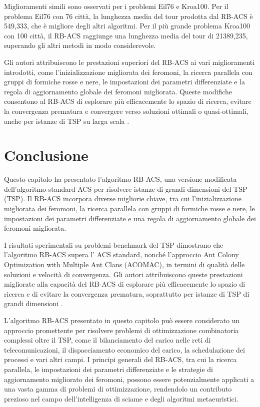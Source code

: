 Miglioramenti simili sono osservati per i problemi Eil76 e Kroa100. Per il problema Eil76 con 76 città, la lunghezza media del tour prodotta dal \gls{RB-ACS} è 549,333, che è migliore degli altri algoritmi. Per il più grande problema Kroa100 con 100 città, il \gls{RB-ACS} raggiunge una lunghezza media del tour di 21389,235, superando gli altri metodi in modo considerevole.

Gli autori attribuiscono le prestazioni superiori del \gls{RB-ACS} ai vari miglioramenti introdotti, come l'inizializzazione migliorata dei feromoni, la ricerca parallela con gruppi di formiche rosse e nere, le impostazioni dei parametri differenziate e la regola di aggiornamento globale dei feromoni migliorata. Queste modifiche consentono al \gls{RB-ACS} di esplorare più efficacemente lo spazio di ricerca, evitare la convergenza prematura e convergere verso soluzioni ottimali o quasi-ottimali, anche per istanze di \gls{TSP} su larga scala \cite{Hassan2013}.

\section{Conclusione}
Questo capitolo ha presentato l'algoritmo \gls{RB-ACS}, una versione modificata dell'algoritmo standard \gls{ACS} per risolvere istanze di grandi dimensioni del  \gls{TSP} (TSP). Il \gls{RB-ACS} incorpora diverse migliorie chiave, tra cui l'inizializzazione migliorata dei feromoni, la ricerca parallela con gruppi di formiche rosse e nere, le impostazioni dei parametri differenziate e una regola di aggiornamento globale dei feromoni migliorata.

I risultati sperimentali su problemi benchmark del \gls{TSP} dimostrano che l'algoritmo \gls{RB-ACS} supera l' \gls{ACS} standard, nonché l'approccio Ant Colony Optimization with Multiple Ant Clans (\gls{ACOMAC}), in termini di qualità delle soluzioni e velocità di convergenza. Gli autori attribuiscono queste prestazioni migliorate alla capacità del \gls{RB-ACS} di esplorare più efficacemente lo spazio di ricerca e di evitare la convergenza prematura, soprattutto per istanze di \gls{TSP} di grandi dimensioni \cite{Hassan2013}.

L'algoritmo \gls{RB-ACS} presentato in questo capitolo può essere considerato un approccio promettente per risolvere problemi di ottimizzazione combinatoria complessi oltre il  \gls{TSP}, come il bilanciamento del carico nelle reti di telecomunicazioni, il dispacciamento economico del carico, la schedulazione dei processi e vari altri campi. I principi generali del \gls{RB-ACS}, tra cui la ricerca parallela, le impostazioni dei parametri differenziate e le strategie di aggiornamento migliorato dei feromoni, possono essere potenzialmente applicati a una vasta gamma di problemi di ottimizzazione, rendendolo un contributo prezioso nel campo dell'intelligenza di sciame e degli algoritmi metaeuristici.

